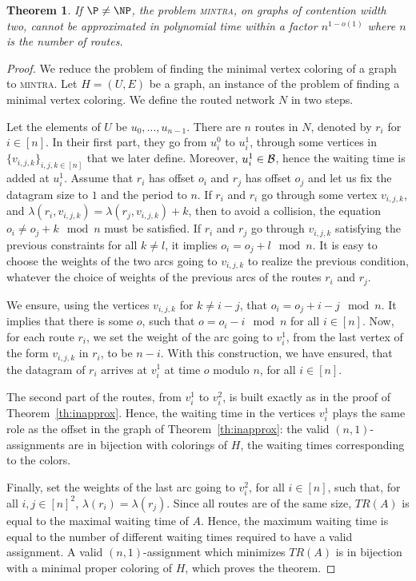 \documentclass[a4paper,10pt]{journal}
\newtheorem{theorem}{Theorem}
\newcommand\mintra{\textsc{mintra}\xspace}
\begin{document}
\begin{theorem}
If $\P \neq \NP$, the problem \mintra, on graphs of contention width two, cannot be approximated in polynomial time within a factor $n^{1-o(1)}$ where $n$ is the number of routes.
\end{theorem}

\begin{proof}
We reduce the problem of finding the minimal vertex coloring of a graph to \mintra.
 Let $H = (U,E)$ be a graph, an instance of the problem of finding a minimal vertex coloring. 
 We define the routed network $N$ in two steps. 

 Let the elements of $U$ be $u_0,\dots, u_{n-1}$. There are $n$ routes in $N$, denoted by $r_i$ for $i \in [n]$. In their first part, they go from $u_i^0$ to $u_i^1$, through some vertices in $\{v_{i,j,k}\}_{i,j,k \in [n]}$ that we later define. Moreover, $u_i^1 \in \cal{B}$, hence the waiting time is added at $u_i^1$. Assume that $r_i$ has offset $o_i$ and $r_j$ has offset $o_j$ and let us fix the datagram size to $1$ and the period to $n$. If $r_i$ and $r_i$ go through some vertex $v_{i,j,k}$, and  $\lambda(r_i,v_{i,j,k}) = \lambda(r_j,v_{i,j,k}) + k$, then to avoid a collision, the equation $o_i \neq o_j + k \mod n$ must be satisfied. If $r_i$ and $r_j$ go through $v_{i,j,k}$ satisfying the previous constraints for all $k \neq l$, it implies $o_i = o_j + l \mod n$. 
 It is easy to choose the weights of the two arcs going to $v_{i,j,k}$ to realize the previous condition, whatever the choice of weights of the previous arcs of the routes $r_i$ and $r_j$.

We ensure, using the vertices $v_{i,j,k}$ for $k \neq i-j$,
that $o_{i} = o_{j} + i - j \mod n$. It implies that there is some $o$, such that 
$ o = o_{i} - i \mod n$ for all $i \in [n]$. Now, for each route $r_i$, we set the weight of the
arc going to $v_i^1$, from the last vertex of the form $v_{i,j,k}$ in $r_i$, to be $n-i$.
With this construction, we have ensured, that the datagram of $r_i$ arrives at 
$v_i^1$ at time $o$ modulo $n$, for all $i \in [n]$. 

The second part of the routes, from $v_i^1$ to $v_i^2$, is built exactly as in the proof of Theorem~\ref{th:inapprox}. Hence, the waiting time in the vertices $v_i^1$ plays the same role as the offset in the graph of Theorem~\ref{th:inapprox}: the valid $(n,1)$-assignments are in bijection with colorings of $H$, the waiting times corresponding to the colors.

Finally, set the weights of the last arc going to $v_i^2$, for all $i \in [n]$, such that, for all $i,j \in [n]^2$, $\lambda(r_i) = \lambda(r_j)$.  Since all routes are of the same size, $TR(A)$ is equal to the maximal waiting time of $A$. Hence, the maximum waiting time is equal to the number of different waiting times required to have a valid assignment. A valid $(n,1)$-assignment which minimizes $TR(A)$ is in bijection with a minimal proper coloring of $H$, which proves the theorem.
\end{proof}
  
\end{document}
